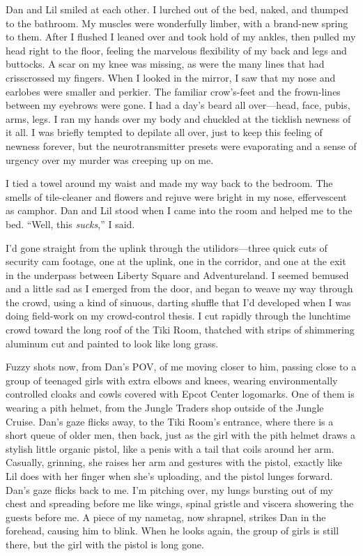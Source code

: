 Dan and Lil smiled at each other. I lurched out of the bed, naked,
and thumped to the bathroom. My muscles were wonderfully limber,
with a brand-new spring to them. After I flushed I leaned over and
took hold of my ankles, then pulled my head right to the floor,
feeling the marvelous flexibility of my back and legs and buttocks.
A scar on my knee was missing, as were the many lines that had
crisscrossed my fingers. When I looked in the mirror, I saw that my
nose and earlobes were smaller and perkier. The familiar
crow's-feet and the frown-lines between my eyebrows were gone. I
had a day's beard all over—head, face, pubis, arms, legs. I ran my
hands over my body and chuckled at the ticklish newness of it all.
I was briefly tempted to depilate all over, just to keep this
feeling of newness forever, but the neurotransmitter presets were
evaporating and a sense of urgency over my murder was creeping up
on me.

I tied a towel around my waist and made my way back to the bedroom.
The smells of tile-cleaner and flowers and rejuve were bright in my
nose, effervescent as camphor. Dan and Lil stood when I came into
the room and helped me to the bed. “Well, this \emph{sucks},” I
said.

I'd gone straight from the uplink through the utilidors—three quick
cuts of security cam footage, one at the uplink, one in the
corridor, and one at the exit in the underpass between Liberty
Square and Adventureland. I seemed bemused and a little sad as I
emerged from the door, and began to weave my way through the crowd,
using a kind of sinuous, darting shuffle that I'd developed when I
was doing field-work on my crowd-control thesis. I cut rapidly
through the lunchtime crowd toward the long roof of the Tiki Room,
thatched with strips of shimmering aluminum cut and painted to look
like long grass.

Fuzzy shots now, from Dan's POV, of me moving closer to him,
passing close to a group of teenaged girls with extra elbows and
knees, wearing environmentally controlled cloaks and cowls covered
with Epcot Center logomarks. One of them is wearing a pith helmet,
from the Jungle Traders shop outside of the Jungle Cruise. Dan's
gaze flicks away, to the Tiki Room's entrance, where there is a
short queue of older men, then back, just as the girl with the pith
helmet draws a stylish little organic pistol, like a penis with a
tail that coils around her arm. Casually, grinning, she raises her
arm and gestures with the pistol, exactly like Lil does with her
finger when she's uploading, and the pistol lunges forward. Dan's
gaze flicks back to me. I'm pitching over, my lungs bursting out of
my chest and spreading before me like wings, spinal gristle and
viscera showering the guests before me. A piece of my nametag, now
shrapnel, strikes Dan in the forehead, causing him to blink. When
he looks again, the group of girls is still there, but the girl
with the pistol is long gone.

